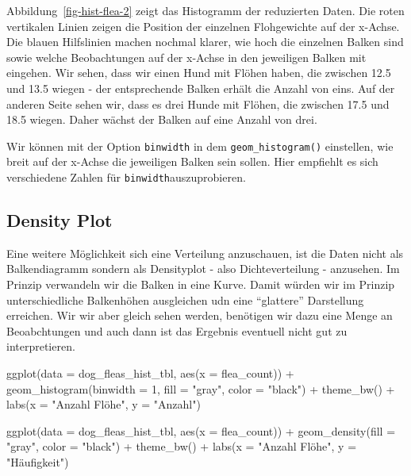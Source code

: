 \documentclass[
  letterpaper,
]{scrbook}
\newenvironment{Shaded}{\begin{snugshade}}{\end{snugshade}}
\newcommand{\AttributeTok}[1]{\textcolor[rgb]{0.40,0.45,0.13}{#1}}
\newcommand{\DecValTok}[1]{\textcolor[rgb]{0.68,0.00,0.00}{#1}}
\newcommand{\FunctionTok}[1]{\textcolor[rgb]{0.28,0.35,0.67}{#1}}
\newcommand{\NormalTok}[1]{\textcolor[rgb]{0.00,0.23,0.31}{#1}}
\newcommand{\SpecialCharTok}[1]{\textcolor[rgb]{0.37,0.37,0.37}{#1}}
\newcommand{\StringTok}[1]{\textcolor[rgb]{0.13,0.47,0.30}{#1}}
\begin{document}
Abbildung~\ref{fig-hist-flea-2} zeigt das Histogramm der reduzierten
Daten. Die roten vertikalen Linien zeigen die Position der einzelnen
Flohgewichte auf der x-Achse. Die blauen Hilfslinien machen nochmal
klarer, wie hoch die einzelnen Balken sind sowie welche Beobachtungen
auf der x-Achse in den jeweiligen Balken mit eingehen. Wir sehen, dass
wir einen Hund mit Flöhen haben, die zwischen 12.5 und 13.5 wiegen - der
entsprechende Balken erhält die Anzahl von eins. Auf der anderen Seite
sehen wir, dass es drei Hunde mit Flöhen, die zwischen 17.5 und 18.5
wiegen. Daher wächst der Balken auf eine Anzahl von drei.

Wir können mit der Option \texttt{binwidth} in dem
\texttt{geom\_histogram()} einstellen, wie breit auf der x-Achse die
jeweiligen Balken sein sollen. Hier empfiehlt es sich verschiedene
Zahlen für \texttt{binwidth}auszuprobieren.

\hypertarget{density-plot}{%
\subsection{Density Plot}\label{density-plot}}

Eine weitere Möglichkeit sich eine Verteilung anzuschauen, ist die Daten
nicht als Balkendiagramm sondern als Densityplot - also Dichteverteilung
- anzusehen. Im Prinzip verwandeln wir die Balken in eine Kurve. Damit
würden wir im Prinzip unterschiedliche Balkenhöhen ausgleichen udn eine
``glattere'' Darstellung erreichen. Wir wir aber gleich sehen werden,
benötigen wir dazu eine Menge an Beoabchtungen und auch dann ist das
Ergebnis eventuell nicht gut zu interpretieren.

\begin{Shaded}
\begin{Highlighting}[]
\FunctionTok{ggplot}\NormalTok{(}\AttributeTok{data =}\NormalTok{ dog\_fleas\_hist\_tbl, }\FunctionTok{aes}\NormalTok{(}\AttributeTok{x =}\NormalTok{ flea\_count)) }\SpecialCharTok{+}
  \FunctionTok{geom\_histogram}\NormalTok{(}\AttributeTok{binwidth =} \DecValTok{1}\NormalTok{, }\AttributeTok{fill =} \StringTok{"gray"}\NormalTok{, }\AttributeTok{color =} \StringTok{"black"}\NormalTok{) }\SpecialCharTok{+}
  \FunctionTok{theme\_bw}\NormalTok{() }\SpecialCharTok{+}
  \FunctionTok{labs}\NormalTok{(}\AttributeTok{x =} \StringTok{"Anzahl Flöhe"}\NormalTok{, }\AttributeTok{y =} \StringTok{"Anzahl"}\NormalTok{)}

\FunctionTok{ggplot}\NormalTok{(}\AttributeTok{data =}\NormalTok{ dog\_fleas\_hist\_tbl, }\FunctionTok{aes}\NormalTok{(}\AttributeTok{x =}\NormalTok{ flea\_count)) }\SpecialCharTok{+}
  \FunctionTok{geom\_density}\NormalTok{(}\AttributeTok{fill =} \StringTok{"gray"}\NormalTok{, }\AttributeTok{color =} \StringTok{"black"}\NormalTok{) }\SpecialCharTok{+}
  \FunctionTok{theme\_bw}\NormalTok{() }\SpecialCharTok{+}
  \FunctionTok{labs}\NormalTok{(}\AttributeTok{x =} \StringTok{"Anzahl Flöhe"}\NormalTok{, }\AttributeTok{y =} \StringTok{"Häufigkeit"}\NormalTok{) }
\end{Highlighting}
\end{Shaded}
\end{document}
